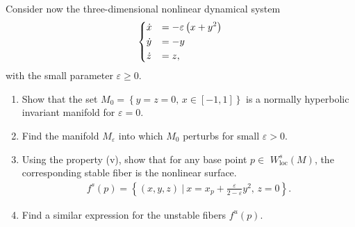 \begin{ex}
\begin{exercise}
Consider now the three-dimensional nonlinear dynamical system
\begin{align}
	\begin{dcases}
\dot{x} &=  -\varepsilon\left(x+y^{2}\right)\\
\dot{y} &=  -y\\
\dot{z} &=  z,
	\end{dcases}
\end{align}
with the small parameter $\varepsilon\geq0$.

\begin{enumerate}
	\item Show that the set $M_{0}=\left\{ y=z=0,\,x\in\left[-1,1\right]\right\} $
is a normally hyperbolic invariant manifold for $\varepsilon=0.$

\item Find the manifold $M_{\varepsilon}$ into which $M_{0}$ perturbs
for small $\varepsilon>0$.

\item Using the property (v), show that for any base point $p\in$ $W_{\mathrm{loc}}^{s}(M)$,
the corresponding stable fiber is the nonlinear surface.
\begin{align}
f^{s}(p)=\left\{ \left(x,y,z\right)~|~x=x_{p}+\frac{\varepsilon}{2-\varepsilon}y^{2},\,z=0\right\} .
\end{align}

\item Find a similar expression for the unstable fibers $f^{u}(p)$.
\end{enumerate}
\end{exercise}


\end{ex}
